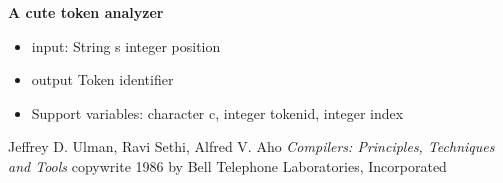 \textbf{\Large A cute token analyzer} 
\\
\begin{itemize}
\item input: String s integer position
\item output
	Token identifier
\item Support variables: character c, integer tokenid, integer index
\end{itemize}



\begin{thebibliography}{99}
 Jeffrey D. Ulman, Ravi Sethi, Alfred V. Aho \textsl{Compilers: Principles, Techniques and Tools} copywrite 1986 by Bell Telephone Laboratories, Incorporated
\end {thebibliography}